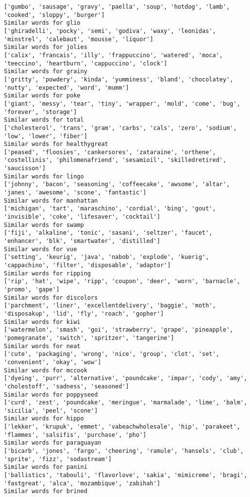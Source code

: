 \documentclass[11pt]{article}
\begin{document}
\begin{Verbatim}[commandchars=\\\{\}]
['gumbo', 'sausage', 'gravy', 'paella', 'soup', 'hotdog', 'lamb', 'cooked', 'sloppy', 'burger']
Similar words for glio
['ghiradelli', 'pocky', 'semi', 'godiva', 'waxy', 'leonidas', 'minstrel', 'calebaut', 'mousse', 'liquor']
Similar words for jolies
['calix', 'francais', 'illy', 'frappuccino', 'watered', 'moca', 'teeccino', 'heartburn', 'cappuccino', 'clock']
Similar words for grainy
['gritty', 'powdery', 'kinda', 'yumminess', 'bland', 'chocolatey', 'nutty', 'expected', 'word', 'mumm']
Similar words for poke
['giant', 'messy', 'tear', 'tiny', 'wrapper', 'mold', 'come', 'bug', 'forever', 'storage']
Similar words for total
['cholesterol', 'trans', 'gram', 'carbs', 'cals', 'zero', 'sodium', 'low', 'lower', 'fiber']
Similar words for healthygreat
['peased', 'floosies', 'cankersores', 'zataraine', 'orthene', 'costellinis', 'philomenafriend', 'sesamioil', 'skilledretired', 'saucisson']
Similar words for lingo
['johnny', 'bacon', 'seasoning', 'coffeecake', 'awsome', 'altar', 'janes', 'awesome', 'scone', 'fantastic']
Similar words for manhattan
['michigan', 'tart', 'maraschino', 'cordial', 'bing', 'gout', 'invisible', 'coke', 'lifesaver', 'cocktail']
Similar words for swamp
['fiji', 'alkaline', 'tonic', 'sasani', 'seltzer', 'faucet', 'enhancer', 'blk', 'smartwater', 'distilled']
Similar words for vue
['setting', 'keurig', 'java', 'nabob', 'explode', 'kuerig', 'cappachino', 'filter', 'disposable', 'adaptor']
Similar words for ripping
['rip', 'hat', 'wipe', 'ripp', 'coupon', 'deer', 'worn', 'barnacle', 'promo', 'gape']
Similar words for discolors
['parchment', 'liner', 'excellentdelivery', 'baggie', 'moth', 'disposakup', 'lid', 'fly', 'roach', 'gopher']
Similar words for kiwi
['watermelon', 'smash', 'goi', 'strawberry', 'grape', 'pineapple', 'pomegranate', 'switch', 'spritzer', 'tangerine']
Similar words for neat
['cute', 'packaging', 'wrong', 'nice', 'group', 'clot', 'set', 'convenient', 'okay', 'wow']
Similar words for mccook
['dyeing', 'purr', 'alternative', 'poundcake', 'impar', 'cody', 'amy', 'cholestoff', 'sadness', 'seasoned']
Similar words for poppyseed
['curd', 'zest', 'poundcake', 'meringue', 'marmalade', 'lime', 'balm', 'sicilia', 'peel', 'scone']
Similar words for hippo
['lekker', 'krupuk', 'emmet', 'vabeachwholesale', 'hip', 'parakeet', 'flammes', 'salsifis', 'purchase', 'pho']
Similar words for paraguayan
['bicarb', 'jones', 'fargo', 'cheering', 'ramule', 'hansels', 'club', 'sprite', 'fizz', 'sodastream']
Similar words for panini
['ballistics', 'tabouli', 'flavorlove', 'sakia', 'mimicreme', 'bragi', 'fastgreat', 'alca', 'mozambique', 'zabihah']
Similar words for brined

\end{Verbatim}
\end{document}
